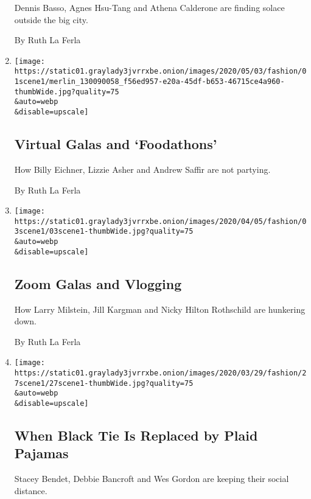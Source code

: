 \begin{enumerate}
  Dennis Basso, Agnes Hsu-Tang and Athena Calderone are finding solace
  outside the big city.

  By Ruth La Ferla
\item
  \href{/2020/05/01/style/virtual-galas-and-foodathons.html}{}

  \texttt{[image: https://static01.graylady3jvrrxbe.onion/images/2020/05/03/fashion/01scene1/merlin\_130090058\_f56ed957-e20a-45df-b653-46715ce4a960-thumbWide.jpg?quality=75\\\&auto=webp\\\&disable=upscale]}

  \hypertarget{virtual-galas-and-foodathons}{%
  \subsection{Virtual Galas and
  `Foodathons'}\label{virtual-galas-and-foodathons}}

  How Billy Eichner, Lizzie Asher and Andrew Saffir are not partying.

  By Ruth La Ferla
\item
  \href{/2020/04/03/style/zoom-galas-and-vlogging.html}{}

  \texttt{[image: https://static01.graylady3jvrrxbe.onion/images/2020/04/05/fashion/03scene1/03scene1-thumbWide.jpg?quality=75\\\&auto=webp\\\&disable=upscale]}

  \hypertarget{zoom-galas-and-vlogging}{%
  \subsection{Zoom Galas and Vlogging}\label{zoom-galas-and-vlogging}}

  How Larry Milstein, Jill Kargman and Nicky Hilton Rothschild are
  hunkering down.

  By Ruth La Ferla
\item
  \href{/2020/03/27/style/when-black-tie-is-replaced-by-plaid-pajamas.html}{}

  \texttt{[image: https://static01.graylady3jvrrxbe.onion/images/2020/03/29/fashion/27scene1/27scene1-thumbWide.jpg?quality=75\\\&auto=webp\\\&disable=upscale]}

  \hypertarget{when-black-tie-is-replaced-by-plaid-pajamas}{%
  \subsection{When Black Tie Is Replaced by Plaid
  Pajamas}\label{when-black-tie-is-replaced-by-plaid-pajamas}}

  Stacey Bendet, Debbie Bancroft and Wes Gordon are keeping their social
  distance.


\end{enumerate}

